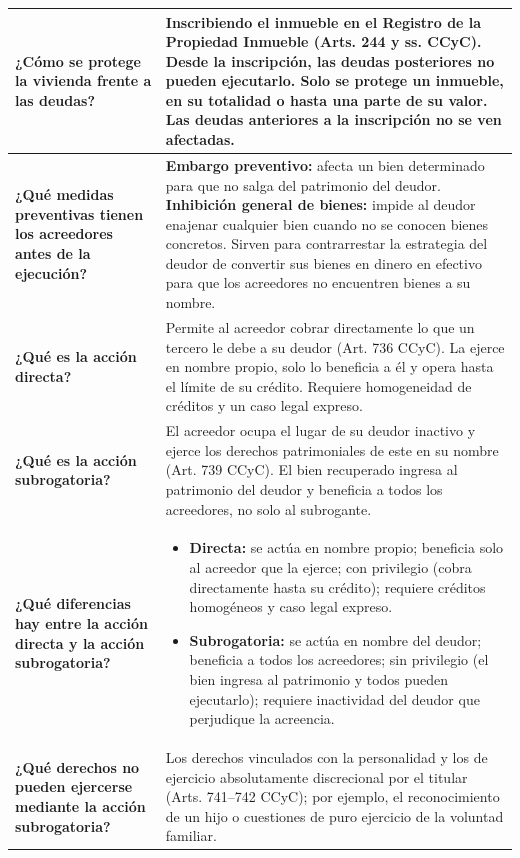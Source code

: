 \documentclass[12pt,oneside]{book}
\newcommand{\cornellpregunta}[2]{\textbf{#1} & #2 \\ \hline}
\begin{document}
\begin{longtable}{|Q|Z|}
\cornellpregunta{¿Cómo se protege la vivienda frente a las deudas?}{%
Inscribiendo el inmueble en el Registro de la Propiedad Inmueble (Arts. 244 y ss. CCyC). Desde la inscripción, las deudas posteriores no pueden ejecutarlo. Solo se protege un inmueble, en su totalidad o hasta una parte de su valor. Las deudas anteriores a la inscripción no se ven afectadas.}

\cornellpregunta{¿Qué medidas preventivas tienen los acreedores antes de la ejecución?}{%
\textbf{Embargo preventivo:} afecta un bien determinado para que no salga del patrimonio del deudor. \textbf{Inhibición general de bienes:} impide al deudor enajenar cualquier bien cuando no se conocen bienes concretos. Sirven para contrarrestar la estrategia del deudor de convertir sus bienes en dinero en efectivo para que los acreedores no encuentren bienes a su nombre.}

\cornellpregunta{¿Qué es la acción directa?}{%
Permite al acreedor cobrar directamente lo que un tercero le debe a su deudor (Art. 736 CCyC). La ejerce en nombre propio, solo lo beneficia a él y opera hasta el límite de su crédito. Requiere homogeneidad de créditos y un caso legal expreso.}

\cornellpregunta{¿Qué es la acción subrogatoria?}{%
El acreedor ocupa el lugar de su deudor inactivo y ejerce los derechos patrimoniales de este en su nombre (Art. 739 CCyC). El bien recuperado ingresa al patrimonio del deudor y beneficia a todos los acreedores, no solo al subrogante.}

\cornellpregunta{¿Qué diferencias hay entre la acción directa y la acción subrogatoria?}{%
\begin{itemize}[nosep,leftmargin=1.2em]
\item \textbf{Directa:} se actúa en nombre propio; beneficia solo al acreedor que la ejerce; con privilegio (cobra directamente hasta su crédito); requiere créditos homogéneos y caso legal expreso.
\item \textbf{Subrogatoria:} se actúa en nombre del deudor; beneficia a todos los acreedores; sin privilegio (el bien ingresa al patrimonio y todos pueden ejecutarlo); requiere inactividad del deudor que perjudique la acreencia.
\end{itemize}}

\cornellpregunta{¿Qué derechos no pueden ejercerse mediante la acción subrogatoria?}{%
Los derechos vinculados con la personalidad y los de ejercicio absolutamente discrecional por el titular (Arts. 741--742 CCyC); por ejemplo, el reconocimiento de un hijo o cuestiones de puro ejercicio de la voluntad familiar.}


\end{longtable}
\end{document}
